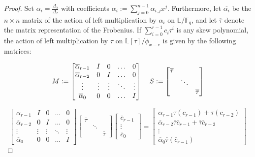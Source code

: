 \documentclass[sigconf]{acmart}
\newcommand{\F}{\mathbb{F}}
\renewcommand{\L}{\mathbb{L}}
\begin{document}
\begin{proof}
Set $\alpha_i = \frac{\Delta_i}{\Delta_r}$ with coefficients $\alpha_i := \sum_{j=0}^{n-1}\alpha_{i,j}x^j$. Furthermore, let $\overline{\alpha_i}$ be the $n\times n$ matrix of the action of left multiplication by $\alpha_i$ on $\L/\F_q$, and let $\overline{\tau}$ denote the matrix representation of the Frobenius. If $\sum_{i=0}^{r-1}c_i \tau^i$ is any skew polynomial, the action of left multiplication by $\tau$ on $\L[\tau]/\phi_{x-e}$ is given by the following matrices:

\begin{equation*}
M :=  \begin{bmatrix}\overline{\alpha}_{r-1} & I & 0 & \ldots & 0 \\ \overline{\alpha}_{r-2} & 0 & I & \ldots & 0 \\ \vdots & \vdots & \vdots & \ddots & \vdots \\ \overline{\alpha}_{0} & 0 & 0 & \ldots & I \end{bmatrix} \hspace{4mm} S := \begin{bmatrix} \overline{\tau} & & \\ & \ddots & \\ & & \overline{\tau} \end{bmatrix}
\end{equation*}

\begin{equation*}
\begin{bmatrix}\overline{\alpha}_{r-1} & I & 0 & \ldots & 0 \\ \overline{\alpha}_{r-2} & 0 & I & \ldots & 0 \\ \vdots & \vdots & \vdots & \ddots & \vdots \\ \overline{\alpha}_{0} & 0 & 0 & \ldots & I \end{bmatrix} \begin{bmatrix} \overline{\tau} & & \\ & \ddots & \\ & & \overline{\tau}\end{bmatrix} \begin{bmatrix} \overline{c}_{r-1} \\ \vdots \\ \overline{c}_{0} \end{bmatrix} = \begin{bmatrix} \overline{\alpha}_{r-1} \overline{\tau}(\overline{c}_{r-1}) + \overline{\tau}(\overline{c}_{r-2}) \\ \overline{\alpha}_{r-2} \overline{\tau} \overline{c}_{r-1} + \overline{\tau} \overline{c}_{r-3} \\ \vdots \\ \overline{\alpha}_{0} \overline{\tau}(\overline{c}_{r-1})  \end{bmatrix}
\end{equation*}


\end{proof}
\end{document}
